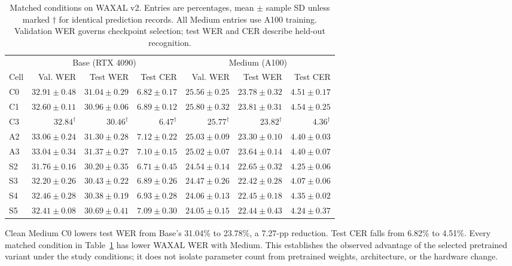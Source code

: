 \documentclass[12pt,a4paper]{report}
\begin{document}
\begin{table}[htbp]\centering\scriptsize
\caption{Matched conditions on WAXAL v2. Entries are percentages, mean $\pm$
sample SD unless marked $\dagger$ for identical prediction records. All Medium
entries use A100 training. Validation WER governs checkpoint selection;
test WER and CER describe held-out recognition.}
\label{tab:waxal}
\setlength{\tabcolsep}{3pt}
\begin{tabular}{lrrrrrr}\toprule
 & \multicolumn{3}{c}{Base (RTX 4090)} & \multicolumn{3}{c}{Medium (A100)}\\
Cell & Val. WER & Test WER & Test CER & Val. WER & Test WER & Test CER\\\midrule
C0 & $32.91 \pm 0.48$ & $31.04 \pm 0.29$ & $6.82 \pm 0.17$ & $25.56 \pm 0.25$ & $23.78 \pm 0.32$ & $4.51 \pm 0.17$ \\
C1 & $32.60 \pm 0.11$ & $30.96 \pm 0.06$ & $6.89 \pm 0.12$ & $25.80 \pm 0.32$ & $23.81 \pm 0.31$ & $4.54 \pm 0.25$ \\
C3 & $32.84^{\dagger}$ & $30.46^{\dagger}$ & $6.47^{\dagger}$ & $25.77^{\dagger}$ & $23.82^{\dagger}$ & $4.36^{\dagger}$ \\
A2 & $33.06 \pm 0.24$ & $31.30 \pm 0.28$ & $7.12 \pm 0.22$ & $25.03 \pm 0.09$ & $23.30 \pm 0.10$ & $4.40 \pm 0.03$ \\
A3 & $33.04 \pm 0.34$ & $31.37 \pm 0.27$ & $7.10 \pm 0.15$ & $25.02 \pm 0.07$ & $23.64 \pm 0.14$ & $4.40 \pm 0.07$ \\
S2 & $31.76 \pm 0.16$ & $30.20 \pm 0.35$ & $6.71 \pm 0.45$ & $24.54 \pm 0.14$ & $22.65 \pm 0.32$ & $4.25 \pm 0.06$ \\
S3 & $32.20 \pm 0.26$ & $30.43 \pm 0.22$ & $6.89 \pm 0.26$ & $24.47 \pm 0.26$ & $22.42 \pm 0.28$ & $4.07 \pm 0.06$ \\
S4 & $32.46 \pm 0.28$ & $30.38 \pm 0.19$ & $6.93 \pm 0.28$ & $24.06 \pm 0.13$ & $22.45 \pm 0.18$ & $4.35 \pm 0.02$ \\
S5 & $32.41 \pm 0.08$ & $30.69 \pm 0.41$ & $7.09 \pm 0.30$ & $24.05 \pm 0.15$ & $22.44 \pm 0.43$ & $4.24 \pm 0.37$ \\
\bottomrule\end{tabular}\end{table}

Clean Medium C0 lowers test WER from Base's 31.04\% to 23.78\%, a 7.27-pp
reduction. Test CER falls from 6.82\% to 4.51\%. Every matched condition in
Table~\ref{tab:waxal} has lower WAXAL WER with Medium. This establishes the
observed advantage of the selected pretrained variant under the study
conditions; it does not isolate parameter count from pretrained weights,
architecture, or the hardware change.
\end{document}
